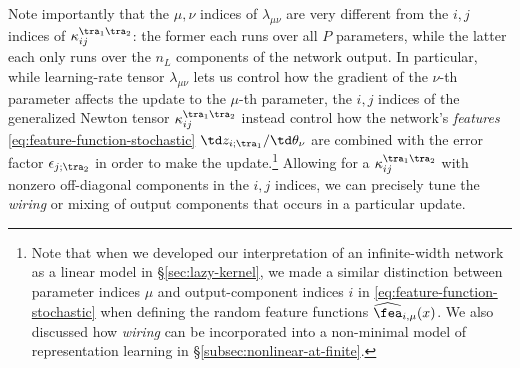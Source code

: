 Note importantly that the $\mu,\nu$ indices of $\lambda_{\mu\nu}$ are very different from the $i,j$ indices of $\kappa^{\tra_1\tra_2}_{ij}$: the former each runs over all $P$ parameters, while the latter each only runs over the $n_L$ components of the network output.
In particular, while learning-rate tensor $\lambda_{\mu\nu}$ lets us control how the gradient of the $\nu$-th parameter affects the update to the $\mu$-th parameter, the $i,j$ indices of the generalized Newton tensor $\kappa^{\tra_1\tra_2}_{ij}$ instead control how the network's \emph{features} \eqref{eq:feature-function-stochastic}
$\td z_{i;\tra_1}/ \td \theta_\nu$ are combined with the error factor $\epsilon_{j;\tra_2}$
in order to make the update.\footnote{Note that when we developed our interpretation of an infinite-width network as a linear model in \S\ref{sec:lazy-kernel}, we  made a similar distinction between parameter indices $\mu$ and output-component indices $i$ in \eqref{eq:feature-function-stochastic} when defining the random feature functions $\widehat{\fea}_{i,\mu}(x)$.
We also discussed how \emph{wiring} can be incorporated into a non-minimal model of representation learning in \S\ref{subsec:nonlinear-at-finite}.
} Allowing for a $\kappa^{\tra_1\tra_2}_{ij}$ with nonzero off-diagonal components in the $i,j$ indices, we can precisely tune the \emph{wiring} or mixing of output components that occurs in a particular update.

